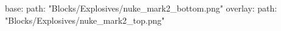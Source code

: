 base:
  path: "Blocks/Explosives/nuke_mark2_bottom.png"
overlay:
  path: "Blocks/Explosives/nuke_mark2_top.png"